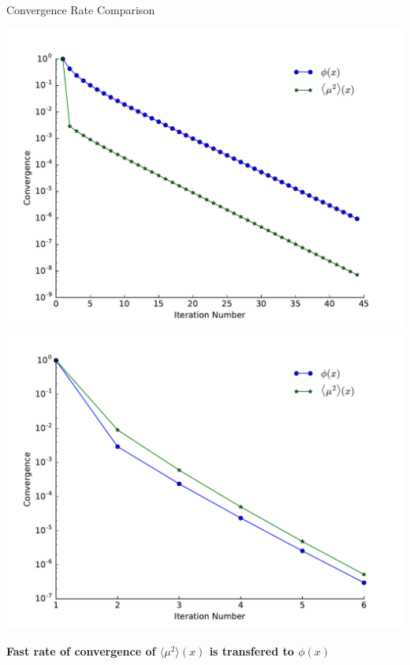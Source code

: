 \documentclass[10pt]{beamer}
\newcommand{\edd}{\langle \mu^2 \rangle}
\begin{document}
\begin{frame}{Convergence Rate Comparison}

    \begin{center}

        \includegraphics[width=.45\paperwidth]{figs/converge_una.pdf}
        \includegraphics[width=.45\paperwidth]{figs/converge_acc.pdf}

    \end{center}

    \vfill
    \centerline{\textbf{Fast rate of convergence of $\edd(x)$ is transfered to $\phi(x)$}}

\end{frame}
\end{document}
